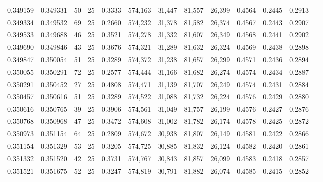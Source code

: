 \begin{tabular}{rrrrrrrrrrrrr}
0.349159 & 0.349331 &    50 &  25 &                                     0.3333 & 574,163 &  31,447 &  81,557 &  26,399 & 0.4564 & 0.2445 & 0.2913 \\
0.349334 & 0.349532 &    69 &  25 &                                     0.2660 & 574,232 &  31,378 &  81,582 &  26,374 & 0.4567 & 0.2443 & 0.2907 \\
0.349533 & 0.349688 &    46 &  25 &                                     0.3521 & 574,278 &  31,332 &  81,607 &  26,349 & 0.4568 & 0.2441 & 0.2902 \\
0.349690 & 0.349846 &    43 &  25 &                                     0.3676 & 574,321 &  31,289 &  81,632 &  26,324 & 0.4569 & 0.2438 & 0.2898 \\
0.349847 & 0.350054 &    51 &  25 &                                     0.3289 & 574,372 &  31,238 &  81,657 &  26,299 & 0.4571 & 0.2436 & 0.2894 \\
0.350055 & 0.350291 &    72 &  25 &                                     0.2577 & 574,444 &  31,166 &  81,682 &  26,274 & 0.4574 & 0.2434 & 0.2887 \\
0.350291 & 0.350452 &    27 &  25 &                                     0.4808 & 574,471 &  31,139 &  81,707 &  26,249 & 0.4574 & 0.2431 & 0.2884 \\
0.350457 & 0.350616 &    51 &  25 &                                     0.3289 & 574,522 &  31,088 &  81,732 &  26,224 & 0.4576 & 0.2429 & 0.2880 \\
0.350616 & 0.350765 &    39 &  25 &                                     0.3906 & 574,561 &  31,049 &  81,757 &  26,199 & 0.4576 & 0.2427 & 0.2876 \\
0.350768 & 0.350968 &    47 &  25 &                                     0.3472 & 574,608 &  31,002 &  81,782 &  26,174 & 0.4578 & 0.2425 & 0.2872 \\
0.350973 & 0.351154 &    64 &  25 &                                     0.2809 & 574,672 &  30,938 &  81,807 &  26,149 & 0.4581 & 0.2422 & 0.2866 \\
0.351154 & 0.351329 &    53 &  25 &                                     0.3205 & 574,725 &  30,885 &  81,832 &  26,124 & 0.4582 & 0.2420 & 0.2861 \\
0.351332 & 0.351520 &    42 &  25 &                                     0.3731 & 574,767 &  30,843 &  81,857 &  26,099 & 0.4583 & 0.2418 & 0.2857 \\
0.351521 & 0.351675 &    52 &  25 &                                     0.3247 & 574,819 &  30,791 &  81,882 &  26,074 & 0.4585 & 0.2415 & 0.2852 \\

\end{tabular}
